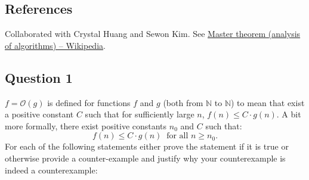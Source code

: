 \def\lc{\left\lceil}   
\def\rc{\right\rceil}
\runningheadrule
\firstpageheadrule
\cfoot{}
\subsection*{References}
Collaborated with Crystal Huang and Sewon Kim. See \href{https://en.wikipedia.org/wiki/Master_theorem_(analysis_of_algorithms)}{Master theorem (analysis of algorithms) -- Wikipedia}.
\subsection*{Question 1}
$f=\mathcal{O}(g)$ is defined for functions $f$ and $g$ (both from $\mathbb{N}$ to $\mathbb{N}$) to mean that exist a positive constant $C$ such that for sufficiently large $n$, $f(n)\leq C\cdot g(n)$. A bit more formally, there exist positive constants $n_0$ and $C$ such that:
$$f(n)\leq C\cdot g(n) \ \text{ for all } n\geq n_0.$$
For each of the following statements either prove the statement if it is true or otherwise provide a counter-example and justify why your counterexample is indeed a counterexample:
